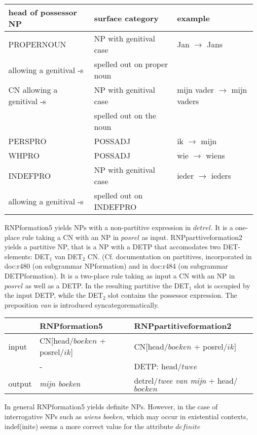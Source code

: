 \begin{description}
\begin{tabular}{|l|l|l|} \hline 
head of possessor NP  & surface category & example\\ \hline
PROPERNOUN & NP with genitival case& Jan $\rightarrow$ Jans\\ 
allowing a genitival -s  &spelled out on proper noun&\\ \hline
CN allowing a genitival -s& NP with genitival case & mijn vader $\rightarrow$  mijn vaders\\
&spelled out on the noun &\\ \hline
PERSPRO & POSSADJ & ik $\rightarrow$ mijn \\ \hline
WHPRO & POSSADJ & wie $\rightarrow$ wiens \\ \hline
INDEFPRO & NP with genitival case 
& ieder $\rightarrow$ ieders\\ 
allowing a genitival -s  &spelled out on INDEFPRO&\\ \hline
\end{tabular}

\end{description}

\noindent
RNPformation5 yields NPs with a non-partitive expression in $detrel$.
It is a one-place rule taking a CN with an NP in $posrel$ as input.
RNPparttiveformation2 yields a partitive NP, that is a NP with a DETP that 
accomodates two DET-elements: DET$_1$ van DET$_2$ CN. (Cf. documentation on 
partitives, incorporated in doc:r480 (on subgrammar NPformation) 
and in doc:r484 (on subgrammar DETPformation).
It is a two-place rule taking as input a CN with an NP in $posrel$ as well as a 
DETP. In the resulting partitive the DET$_1$ slot is occupied by the input DETP, 
while the DET$_2$ slot contains the possessor expression. 
The preposition {\em van} is introduced syncategorematically. 
\\

\begin{tabular}{|l|l|l|} \hline
&      RNPformation5& RNPpartitiveformation2\\ \hline
input&CN[head/$boeken$ + posrel/$ik]$ &CN[head/$boeken$ + posrel/$ik$]\\
& - &DETP: head/$twee$\\ \hline
output&{\em mijn boeken}& detrel/{\em twee van mijn} +  head/$boeken$\\ \hline
\end{tabular}


\noindent
In general RNPformation5 yields definite NPs. However, in the case of 
interrogative NPs such as {\em 
wiens boeken}, which may occur in existential contexts, 
indef(inite) seems a more correct value for the attribute $
definite$

